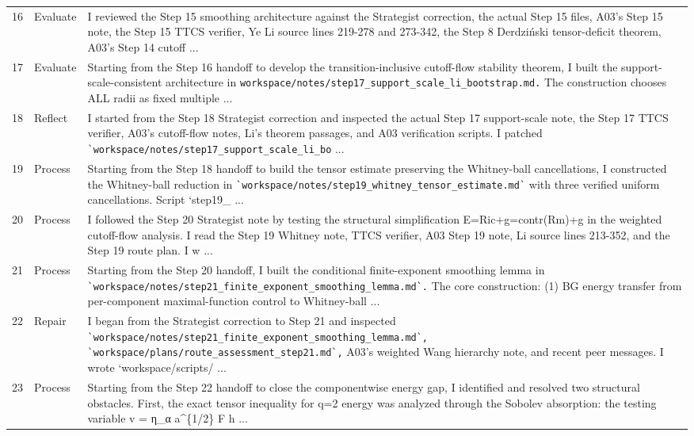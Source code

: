 \documentclass[UTF8,fontset=fandol,zihao=-4]{ctexart}
\begin{document}
\begin{longtable}{r p{} >{\raggedright\arraybackslash}p{}}
16 & Evaluate & I reviewed the Step 15 smoothing architecture against the Strategist correction, the actual Step 15 files, A03's Step 15 note, the Step 15 TTCS verifier, Ye Li source lines 219-278 and 273-342, the Step 8 Derdziński tensor-deficit theorem, A03's Step 14 cutoff ...\\
17 & Evaluate & Starting from the Step 16 handoff to develop the transition-inclusive cutoff-flow stability theorem, I built the support-scale-consistent architecture in \nolinkurl{workspace/notes/step17_support_scale_li_bootstrap.md.} The construction chooses ALL radii as fixed multiple ...\\
18 & Reflect & I started from the Step 18 Strategist correction and inspected the actual Step 17 support-scale note, the Step 17 TTCS verifier, A03's cutoff-flow notes, Li's theorem passages, and A03 verification scripts. I patched \nolinkurl{`workspace/notes/step17_support_scale_li_bo} ...\\
19 & Process & Starting from the Step 18 handoff to build the tensor estimate preserving the Whitney-ball cancellations, I constructed the Whitney-ball reduction in \nolinkurl{`workspace/notes/step19_whitney_tensor_estimate.md`} with three verified uniform cancellations. Script `step19\_ ...\\
20 & Process & I followed the Step 20 Strategist note by testing the structural simplification E=Ric+g=contr(Rm)+g in the weighted cutoff-flow analysis. I read the Step 19 Whitney note, TTCS verifier, A03 Step 19 note, Li source lines 213-352, and the Step 19 route plan. I w ...\\
21 & Process & Starting from the Step 20 handoff, I built the conditional finite-exponent smoothing lemma in \nolinkurl{`workspace/notes/step21_finite_exponent_smoothing_lemma.md`.} The core construction: (1) BG energy transfer from per-component maximal-function control to Whitney-ball ...\\
22 & Repair & I began from the Strategist correction to Step 21 and inspected \nolinkurl{`workspace/notes/step21_finite_exponent_smoothing_lemma.md`,} \nolinkurl{`workspace/plans/route_assessment_step21.md`,} A03's weighted Wang hierarchy note, and recent peer messages. I wrote `workspace/scripts/ ...\\
23 & Process & Starting from the Step 22 handoff to close the componentwise energy gap, I identified and resolved two structural obstacles. First, the exact tensor inequality for q=2 energy was analyzed through the Sobolev absorption: the testing variable v = η\_α a\textasciicircum{}\{1/2\} F h ...\\

\end{longtable}
\end{document}
